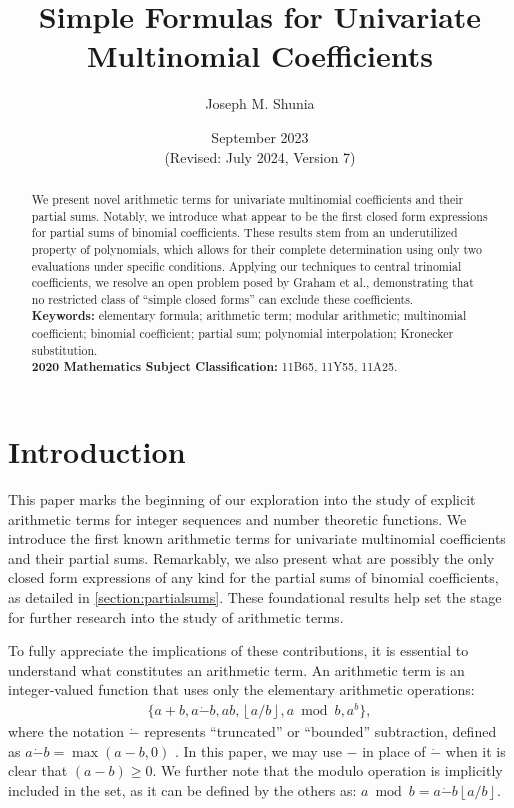 \documentclass[10pt,a4paper]{article}
\title{Simple Formulas for Univariate Multinomial Coefficients}
\author{Joseph M. Shunia}
\date{September 2023 \\ \small (Revised: July 2024, Version 7) \normalsize}
\theoremstyle{plain}
\newcommand{\floor}[1]{\left\lfloor #1 \right\rfloor}
\begin{document}
\maketitle

 \begin{abstract}
 \noindent
We present novel arithmetic terms for univariate multinomial coefficients and their partial sums. Notably, we introduce what appear to be the first closed form expressions for partial sums of binomial coefficients. These results stem from an underutilized property of polynomials, which allows for their complete determination using only two evaluations under specific conditions. Applying our techniques to central trinomial coefficients, we resolve an open problem posed by Graham et al., demonstrating that no restricted class of ``simple closed forms'' can exclude these coefficients.
 \\[2mm]
 {\bf Keywords:} elementary formula; arithmetic term; modular arithmetic; multinomial coefficient; binomial coefficient; partial sum; polynomial interpolation; Kronecker substitution.\\[2mm]
 {\bf 2020 Mathematics Subject Classification:} 11B65, 11Y55, 11A25.
 \end{abstract}

\section{Introduction}
This paper marks the beginning of our exploration into the study of explicit arithmetic terms for integer sequences and number theoretic functions. We introduce the first known arithmetic terms for univariate multinomial coefficients and their partial sums. Remarkably, we also present what are possibly the only closed form expressions of any kind for the partial sums of binomial coefficients, as detailed in \cref{section:partialsums}. These foundational results help set the stage for further research into the study of arithmetic terms.

To fully appreciate the implications of these contributions, it is essential to understand what constitutes an arithmetic term. An arithmetic term is an integer-valued function that uses only the elementary arithmetic operations:
\begin{align*}
    \{ a + b, a \dot{-} b, ab, \floor{a/b}, a \bmod b, a^b \} ,
\end{align*}
where the notation $\dot{-}$ represents ``truncated'' or ``bounded'' subtraction, defined as $a \dot{-} b = \max(a-b,0)$ \cite{mazzanti2002plainbases, prunescu2024representation}. In this paper, we may use $-$ in place of $\dot{-}$ when it is clear that $(a-b) \geq 0$. We further note that the modulo operation is implicitly included in the set, as it can be defined by the others as: $a \bmod b = a \dot{-} b \floor{a/b}$. 
\end{document}
